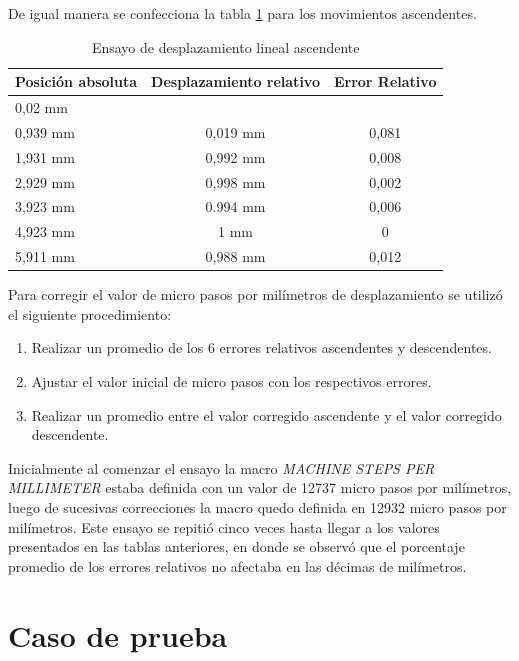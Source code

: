 De igual manera se confecciona la tabla \ref{tab:ensayo_desplazamiento_asc} para los movimientos ascendentes.
 
\begin{table}[h]
	\centering
	\caption[Ensayo de desplazamiento]{Ensayo de desplazamiento lineal ascendente}
	\begin{tabular}{l c c }    
		\toprule
		\textbf{Posición absoluta}     & \textbf{Desplazamiento relativo} & \textbf{Error Relativo} \\
		\midrule
		0,02 mm	& 	        	& 	 			 	\\		
		0,939 mm    & 	0,019 mm    	& 	0,081	\\
		1,931 mm 	& 	0,992 mm	    & 	0,008 	\\
		2,929 mm	& 	0,998 mm	    & 	0,002 	\\
		3,923 mm 	& 	0.994 mm        & 	0,006	\\
		4,923 mm 	& 	1 mm	    	& 	0		\\
		5,911 mm 	& 	0,988 mm        & 	0,012 	\\
		\bottomrule
		\hline
	\end{tabular}
	\label{tab:ensayo_desplazamiento_asc}
\end{table}


Para corregir el valor de micro pasos por milímetros de desplazamiento se utilizó el siguiente procedimiento:
\begin{enumerate}
\item Realizar un promedio de los 6 errores relativos ascendentes y descendentes.
\item Ajustar el valor inicial de micro pasos con los respectivos errores. 
\item Realizar un promedio entre el valor corregido ascendente y el valor corregido descendente.
\end{enumerate}


Inicialmente al comenzar el ensayo la macro \textit{MACHINE STEPS PER MILLIMETER}  estaba definida con un valor de 12737 micro pasos por milímetros, luego de sucesivas correcciones la macro quedo definida en 12932 micro pasos por milímetros.
Este ensayo se repitió cinco veces hasta llegar a los valores presentados en las tablas anteriores, en donde se observó que el porcentaje promedio de los errores relativos no afectaba en las décimas de milímetros.

\section{Caso de prueba}
